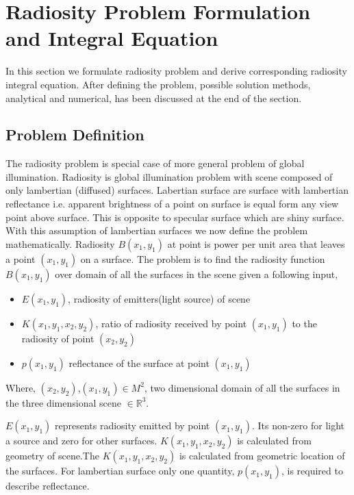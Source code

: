 
\chapter{\label{ch:problemformulatio}Radiosity Problem Formulation and Integral Equation}

In this section we formulate radiosity problem and derive corresponding radiosity integral equation. After defining the problem, possible solution methods, analytical and numerical, has been discussed at the end of the section.


\section{Problem Definition}
The radiosity problem is special case of more general problem of global illumination. Radiosity is global illumination problem with scene composed of only lambertian (diffused) surfaces. Labertian surface are surface with lambertian reflectance i.e. apparent brightness of a point on surface is equal form any view point above surface. This is opposite to specular surface which are shiny surface. With this assumption of lambertian surfaces we now define the problem mathematically.
Radiosity $B(x_1,y_1)$ at point is power per unit area that leaves a point $(x_1,y_1)$ on a surface. The problem is to find the radiosity function  $B(x_1,y_1)$ over domain of all the surfaces in the scene given a following input,
\begin{itemize}
\item $E(x_1,y_1)$, radiosity of emitters(light source) of scene
\item $K(x_1,y_1,x_2,y_2)$, ratio of radiosity received by point $(x_1,y_1)$ to the radiosity of  point $(x_2,y_2)$\\
\item $p(x_1,y_1)$ reflectance of the surface at point $(x_1,y_1)$\\

\end{itemize}
Where, $(x_2,y_2)$,$(x_1,y_1)  \in  M^2$, two dimensional domain of all the surfaces in the  three dimensional scene $\in \mathbb{R}^3$.

$E(x_1,y_1)$ represents radiosity emitted by point $(x_1,y_1)$. Its non-zero for light a source and zero for other surfaces. $K(x_1,y_1,x_2,y_2)$ is calculated from geometry of scene.The $K(x_1,y_1,x_2,y_2)$ is calculated from geometric location of the surfaces. For lambertian surface only one quantity,  $p(x_1,y_1)$, is required to describe reflectance.

